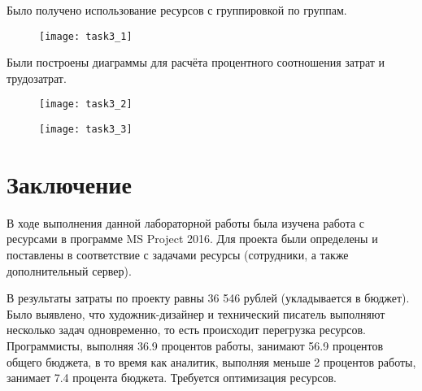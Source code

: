 Было получено использование ресурсов с группировкой по группам.
\begin{figure}[h!]
	\texttt{[image: task3\_1]}
\end{figure}

Были построены диаграммы для расчёта процентного соотношения затрат и трудозатрат.

\begin{figure}[h!]
	\texttt{[image: task3\_2]}
\end{figure}

\begin{figure}[h!]
	\texttt{[image: task3\_3]}
\end{figure}


\clearpage

\section*{Заключение}

В ходе выполнения данной лабораторной работы была изучена работа с ресурсами в программе MS Project 2016. Для проекта были определены и поставлены в соответствие с задачами ресурсы (сотрудники, а также дополнительный сервер). 

В результаты затраты по проекту равны 36 546 рублей (укладывается в бюджет). 
Было выявлено, что художник-дизайнер и технический писатель выполняют несколько задач одновременно, то есть происходит перегрузка ресурсов. 
Программисты, выполняя 36.9 процентов работы, занимают 56.9 процентов общего бюджета, в то время как аналитик, выполняя меньше 2 процентов работы, занимает 7.4 процента бюджета.
Требуется оптимизация ресурсов.